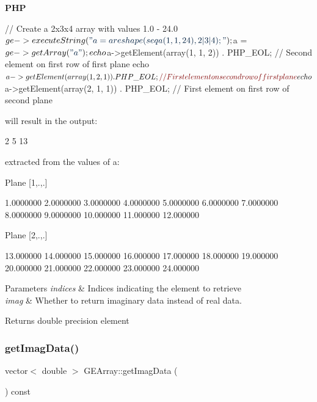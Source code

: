 {\bfseries P\+HP} 
\begin{DoxyCode}
\textcolor{comment}{// Create a 2x3x4 array with values 1.0 - 24.0}
$ge->executeString(\textcolor{stringliteral}{"a = areshape(seqa(1, 1, 24), 2|3|4);"});
$a = $ge->getArray(\textcolor{stringliteral}{"a"});
echo $a->getElement(array(1, 1, 2)) . PHP\_EOL; \textcolor{comment}{// Second element on first row of first plane}
echo $a->getElement(array(1, 2, 1)) . PHP\_EOL; \textcolor{comment}{// First element on second row of first plane}
echo $a->getElement(array(2, 1, 1)) . PHP\_EOL; \textcolor{comment}{// First element on first row of second plane}
\end{DoxyCode}
 will result in the output\+: 
\begin{DoxyCode}
2
5
13
\end{DoxyCode}
 extracted from the values of a\+: 
\begin{DoxyCode}
Plane [1,.,.]

       1.0000000        2.0000000        3.0000000        4.0000000
       5.0000000        6.0000000        7.0000000        8.0000000
       9.0000000        10.000000        11.000000        12.000000

Plane [2,.,.]

       13.000000        14.000000        15.000000        16.000000
       17.000000        18.000000        19.000000        20.000000
       21.000000        22.000000        23.000000        24.000000
\end{DoxyCode}



\begin{DoxyParams}{Parameters}
{\em indices} & Indices indicating the element to retrieve \\
\hline
{\em imag} & Whether to return imaginary data instead of real data. \\
\hline
\end{DoxyParams}
\begin{DoxyReturn}{Returns}
double precision element 
\end{DoxyReturn}
\mbox{\label{class_g_e_array_a13a837cc6784562be80f64e4aa3ce4a5}} 
\subsubsection{\texorpdfstring{get\+Imag\+Data()}{getImagData()}}
{\footnotesize\ttfamily vector$<$ double $>$ G\+E\+Array\+::get\+Imag\+Data (\begin{DoxyParamCaption}{ }\end{DoxyParamCaption}) const}



